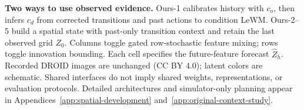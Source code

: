 \textbf{Two ways to use observed evidence.} Ours-1 calibrates history with $c_o$, then infers $c_d$ from corrected transitions and past actions to condition LeWM. Ours-2--5 build a spatial state with past-only transition context and retain the last observed grid $Z_0$. Columns toggle gated row-stochastic feature mixing; rows toggle innovation bounding. Each cell specifies the future-feature forecast $\hat Z_h$. Recorded DROID images are unchanged (CC BY 4.0); latent colors are schematic. Shared interfaces do not imply shared weights, representations, or evaluation protocols. Detailed architectures and simulator-only planning appear in Appendices~\ref{app:spatial-development} and~\ref{app:original-context-study}.
